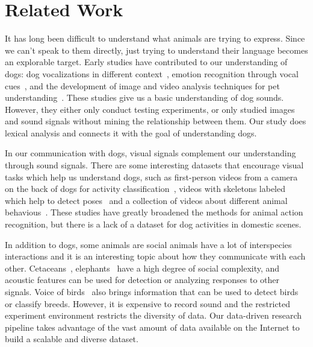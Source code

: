\section{Related Work}
\label{sec:related}

It has long been difficult to understand what animals are trying to express. Since we can't speak to them directly, just trying to understand their language becomes an explorable target. Early studies have contributed to our understanding of dogs: dog vocalizations in different context~\cite{molnar2009dogs, robbins2000vocal}, emotion recognition through vocal cues~\cite{pongracz2006acoustic}, and the development of image and video analysis techniques for pet understanding~\cite{mao2023pet}. These studies give us a basic understanding of dog sounds. However, they either only conduct testing experiments, or only studied images and sound signals without mining the relationship between them. Our study does lexical analysis and connects it with the goal of understanding dogs.


In our communication with dogs, visual signals complement our understanding through sound signals. There are some interesting datasets that encourage visual tasks which help us understand dogs, such as first-person videos from a camera on the back of dogs for activity classification~\cite{iwashita2014first}, videos with skeletons labeled which help to detect poses~\cite{cao2019cross} and a collection of videos about different animal behavious~\cite{ng2022animal}. These studies have greatly broadened the methods for animal action recognition, but there is a lack of a dataset for dog activities in domestic scenes.



In addition to dogs, some animals are %
social animals have a lot of interspecies interactions and it is an interesting topic about how they communicate with each other. Cetaceans~\cite{bermant2019deep}, elephants~\cite{rossman2020contagious} have a high degree of social complexity, and acoustic features can be used for detection or analyzing responses to other signals. Voice of birds~\cite{koh2019bird, salamon2017fusing, adavanne2017stacked} also brings information that can be used to detect birds or classify breeds. However, it is expensive to record sound and the restricted experiment environment restricts the diversity of data. Our data-driven research pipeline takes advantage of the vast amount of data available on the Internet to build a scalable and diverse dataset.


